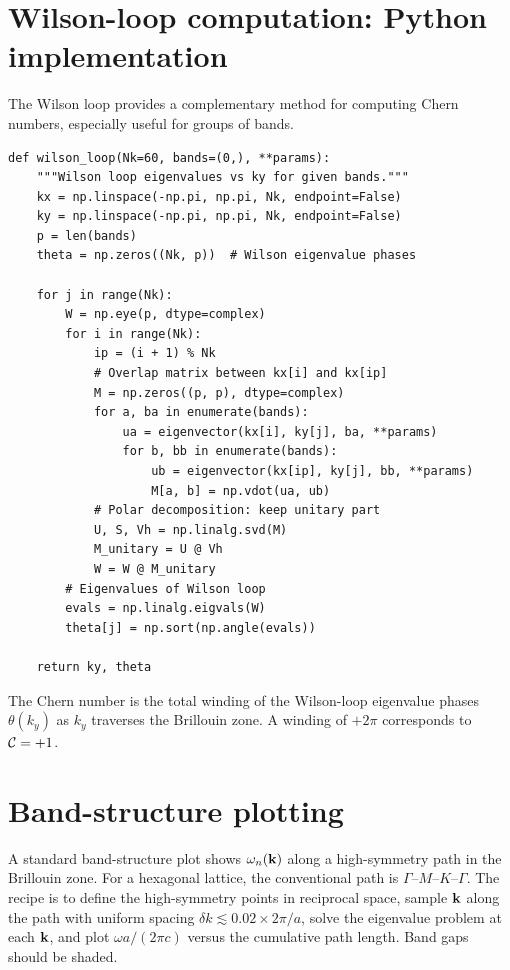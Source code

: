 \section{Wilson-loop computation: Python implementation}
\label{sec:appC-wilson-python}

The Wilson loop provides a complementary method for computing Chern
numbers, especially useful for groups of bands.

\begin{verbatim}
def wilson_loop(Nk=60, bands=(0,), **params):
    """Wilson loop eigenvalues vs ky for given bands."""
    kx = np.linspace(-np.pi, np.pi, Nk, endpoint=False)
    ky = np.linspace(-np.pi, np.pi, Nk, endpoint=False)
    p = len(bands)
    theta = np.zeros((Nk, p))  # Wilson eigenvalue phases

    for j in range(Nk):
        W = np.eye(p, dtype=complex)
        for i in range(Nk):
            ip = (i + 1) % Nk
            # Overlap matrix between kx[i] and kx[ip]
            M = np.zeros((p, p), dtype=complex)
            for a, ba in enumerate(bands):
                ua = eigenvector(kx[i], ky[j], ba, **params)
                for b, bb in enumerate(bands):
                    ub = eigenvector(kx[ip], ky[j], bb, **params)
                    M[a, b] = np.vdot(ua, ub)
            # Polar decomposition: keep unitary part
            U, S, Vh = np.linalg.svd(M)
            M_unitary = U @ Vh
            W = W @ M_unitary
        # Eigenvalues of Wilson loop
        evals = np.linalg.eigvals(W)
        theta[j] = np.sort(np.angle(evals))

    return ky, theta
\end{verbatim}

The Chern number is the total winding of the Wilson-loop eigenvalue
phases $\theta(k_y)$ as $k_y$ traverses the Brillouin zone.  A winding
of $+2\pi$ corresponds to $\mathcal{C}=+1$.

\section{Band-structure plotting}
\label{sec:appC-plotting}

A standard band-structure plot shows $\omega_n(\mathbf{k})$ along a
high-symmetry path in the Brillouin zone.  For a hexagonal lattice,
the conventional path is $\Gamma$--$M$--$K$--$\Gamma$.  The recipe is
to define the high-symmetry points in reciprocal space, sample $\mathbf{k}$
along the path with uniform spacing $\delta k\lesssim 0.02\times 2\pi/a$,
solve the eigenvalue problem at each $\mathbf{k}$, and plot
$\omega a/(2\pi c)$ versus the cumulative path length.  Band gaps
should be shaded.

